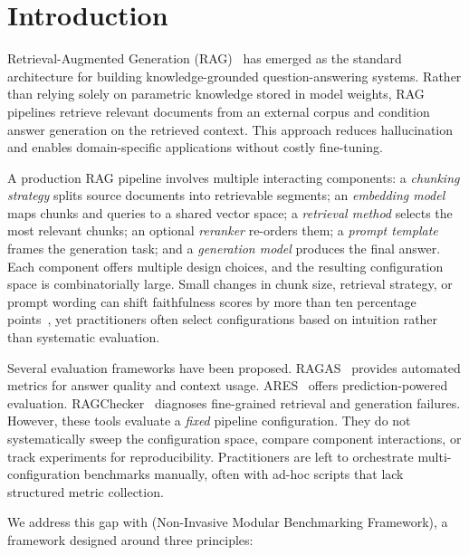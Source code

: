 \section{Introduction}
\label{sec:intro}

Retrieval-Augmented Generation (RAG)~\cite{lewis2020retrieval} has emerged as the standard architecture for building knowledge-grounded question-answering systems. Rather than relying solely on parametric knowledge stored in model weights, RAG pipelines retrieve relevant documents from an external corpus and condition answer generation on the retrieved context. This approach reduces hallucination~\cite{shuster2021retrieval} and enables domain-specific applications without costly fine-tuning.

A production RAG pipeline involves multiple interacting components: a \emph{chunking strategy} splits source documents into retrievable segments; an \emph{embedding model} maps chunks and queries to a shared vector space; a \emph{retrieval method} selects the most relevant chunks; an optional \emph{reranker} re-orders them; a \emph{prompt template} frames the generation task; and a \emph{generation model} produces the final answer. Each component offers multiple design choices, and the resulting configuration space is combinatorially large. Small changes in chunk size, retrieval strategy, or prompt wording can shift faithfulness scores by more than ten percentage points~\cite{chen2024benchmarking}, yet practitioners often select configurations based on intuition rather than systematic evaluation.

Several evaluation frameworks have been proposed. RAGAS~\cite{es2023ragas} provides automated metrics for answer quality and context usage. ARES~\cite{saadfalcon2024ares} offers prediction-powered evaluation. RAGChecker~\cite{ragchecker2024} diagnoses fine-grained retrieval and generation failures. However, these tools evaluate a \emph{fixed} pipeline configuration. They do not systematically sweep the configuration space, compare component interactions, or track experiments for reproducibility. Practitioners are left to orchestrate multi-configuration benchmarks manually, often with ad-hoc scripts that lack structured metric collection.

We address this gap with \toolname{} (Non-Invasive Modular Benchmarking Framework), a framework designed around three principles:

